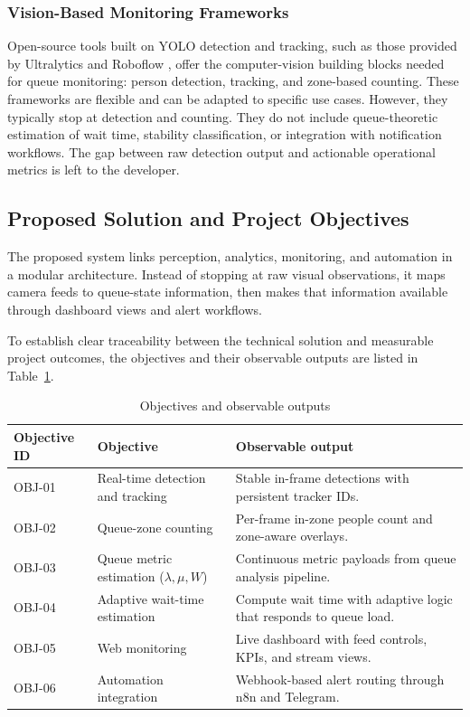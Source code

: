 \subsubsection{Vision-Based Monitoring Frameworks}
Open-source tools built on YOLO detection and tracking, such as those provided by Ultralytics \cite{ultralytics_docs} and Roboflow \cite{roboflow_queue}, offer the computer-vision building blocks needed for queue monitoring: person detection, tracking, and zone-based counting. These frameworks are flexible and can be adapted to specific use cases. However, they typically stop at detection and counting. They do not include queue-theoretic estimation of wait time, stability classification, or integration with notification workflows. The gap between raw detection output and actionable operational metrics is left to the developer.


\subsection{Proposed Solution and Project Objectives}
The proposed system links perception, analytics, monitoring, and automation in a modular architecture. Instead of stopping at raw visual observations, it maps camera feeds to queue-state information, then makes that information available through dashboard views and alert workflows.

To establish clear traceability between the technical solution and measurable project outcomes, the objectives and their observable outputs are listed in Table~\ref{tab:objective_traceability}.
\begin{table}[H]
    \centering
    \begingroup\setlength{\tabcolsep}{4pt}\renewcommand{\arraystretch}{0.95}\footnotesize
    \begin{tabularx}{\textwidth}{|l|X|X|}
        \hline
        Objective ID & Objective & Observable output \\ \hline
        OBJ-01 & Real-time detection and tracking & Stable in-frame detections with persistent tracker IDs. \\ \hline
        OBJ-02 & Queue-zone counting & Per-frame in-zone people count and zone-aware overlays. \\ \hline
        OBJ-03 & Queue metric estimation ($\lambda,\mu,W$) & Continuous metric payloads from queue analysis pipeline. \\ \hline
        OBJ-04 & Adaptive wait-time estimation & Compute wait time with adaptive logic that responds to queue load. \\ \hline
        OBJ-05 & Web monitoring & Live dashboard with feed controls, KPIs, and stream views. \\ \hline
        OBJ-06 & Automation integration & Webhook-based alert routing through n8n and Telegram. \\ \hline
    \end{tabularx}
    \caption{Objectives and observable outputs}
    \label{tab:objective_traceability}
    \endgroup
\end{table}

